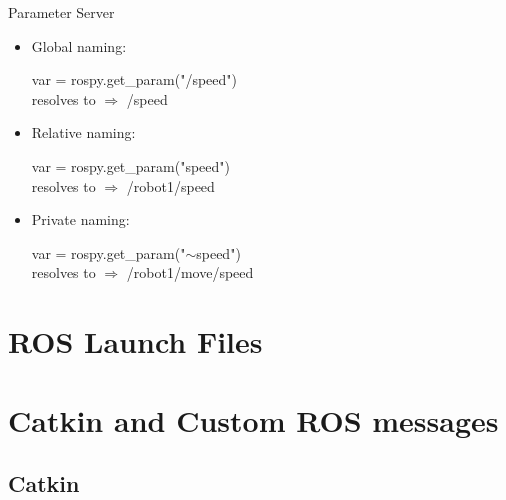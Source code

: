 \documentclass{beamer}
\begin{document}
\begin{frame}{Parameter Server}

    \begin{itemize}
        \item Global naming:
        \begin{focus}
            \centering
            \fontsize{9}{1} \ttfamily  var = rospy.get\_param("/speed") \\ \vspace{0.2cm}  resolves to  $\Rightarrow$ {\color{red} /speed}
        \end{focus}
        
        \item Relative naming:
        \begin{focus}
            \centering
            \fontsize{9}{1} \ttfamily var = rospy.get\_param("speed")\\ \vspace{0.2cm}  resolves to  $\Rightarrow$ {\color{red} /robot1/speed}
        \end{focus}  
        
        \item Private naming:
        \begin{focus}
            \centering
            \fontsize{9}{1} \ttfamily var = rospy.get\_param("$\sim$speed")\\ \vspace{0.2cm}  resolves to  $\Rightarrow$ {\color{red} /robot1/move/speed}
        \end{focus}        
        
    \end{itemize}
    
\end{frame}




\section{ROS Launch Files}


\section{Catkin and Custom ROS messages}



\subsection{Catkin}
\end{document}
